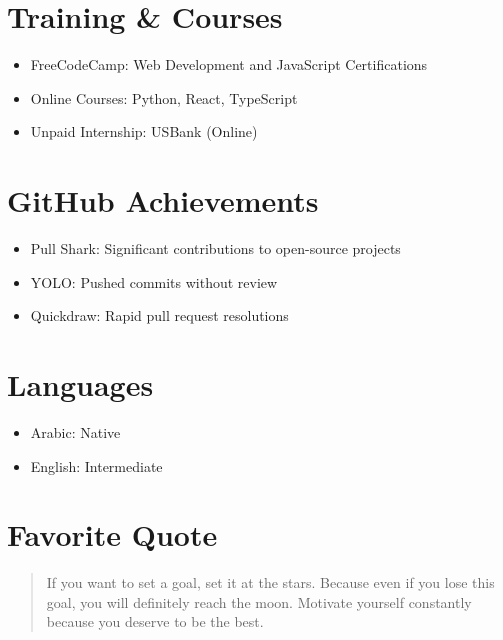\documentclass[a4paper,11pt]{article}
\begin{document}
\section*{Training \& Courses}
\begin{itemize}
    \item FreeCodeCamp: Web Development and JavaScript Certifications
    \item Online Courses: Python, React, TypeScript
    \item Unpaid Internship: USBank (Online)
\end{itemize}

\section*{GitHub Achievements}
\begin{itemize}
    \item Pull Shark: Significant contributions to open-source projects
    \item YOLO: Pushed commits without review
    \item Quickdraw: Rapid pull request resolutions
\end{itemize}

\section*{Languages}
\begin{itemize}
    \item Arabic: Native
    \item English: Intermediate
\end{itemize}

\section*{Favorite Quote}
\begin{quote}
If you want to set a goal, set it at the stars. Because even if you lose this goal, you will definitely reach the moon. Motivate yourself constantly because you deserve to be the best.
\end{quote}
\end{document}
